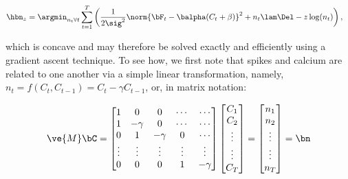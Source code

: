 \begin{align} \label{eq:eta}
\hbn_{\zzz} &= \argmin_{n_t \forall t}  \sum_{t=1}^T \left( \frac{1}{2 \sig^2}\norm{\bF_t -\balpha (C_t + \beta)}^2  +  n_t  \lam \Del - \zzz \log(n_t) \right),
\end{align}

\noindent which is concave and may therefore be solved exactly and efficiently using a gradient ascent technique. To see how, we first note that   
spikes and calcium are related to one another via a simple linear transformation, namely, $n_t=f(C_t,C_{t-1})= C_t - \gamma C_{t-1}$, or, in matrix notation: 

\begin{align} \label{eq:M}
\ve{M} \bC = %
\begin{bmatrix}
1 & 0  & 0 & \cdots & \cdots \\
1 & -\gamma & 0 & \cdots & \cdots \\
0 & 1 & -\gamma & 0 & \cdots  \\
\vdots & \vdots & \vdots & \vdots & \vdots  \\
0 & 0 & 0 & 1 & -\gamma
\end{bmatrix}
\begin{bmatrix}
C_1 \\ C_2 \\ \vdots \\ \vdots \\ C_T  
\end{bmatrix}
= 
\begin{bmatrix}
n_1 \\ n_2 \\ \vdots \\ \vdots \\ n_T
\end{bmatrix}
= \bn
\end{align}

